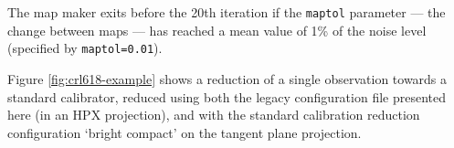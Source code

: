 \documentclass[usenatbib]{mnras}
\newcommand{\note}[1]{\textcolor{red}{Note: #1}}
\begin{document}
The map maker exits before the 20th iteration if the \texttt{maptol}
parameter --- the change between maps --- has reached a mean value of 1\%
of the noise level (specified by \texttt{maptol=0.01}).






Figure \ref{fig:crl618-example} shows a reduction of a single
observation towards a standard calibrator, reduced using both the
legacy configuration file presented here (in an HPX projection), and
with the standard calibration reduction configuration `bright compact'
on the tangent plane projection.
\end{document}
